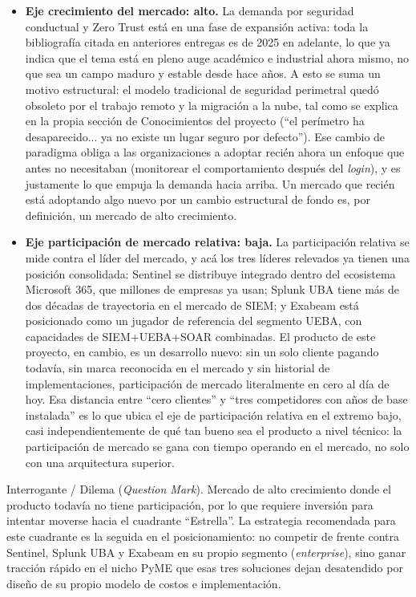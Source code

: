 \begin{itemize}
	\item \textbf{Eje crecimiento del mercado: alto.} La demanda por seguridad conductual y Zero Trust está en una fase de expansión activa: toda la bibliografía citada en anteriores entregas es de 2025 en adelante, lo que ya indica que el tema está en pleno auge académico e industrial ahora mismo, no que sea un campo maduro y estable desde hace años. A esto se suma un motivo estructural: el modelo tradicional de seguridad perimetral quedó obsoleto por el trabajo remoto y la migración a la nube, tal como se explica en la propia sección de Conocimientos del proyecto (``el perímetro ha desaparecido... ya no existe un lugar seguro por defecto''). Ese cambio de paradigma obliga a las organizaciones a adoptar recién ahora un enfoque que antes no necesitaban (monitorear el comportamiento después del \emph{login}), y es justamente lo que empuja la demanda hacia arriba. Un mercado que recién está adoptando algo nuevo por un cambio estructural de fondo es, por definición, un mercado de alto crecimiento.
	\item \textbf{Eje participación de mercado relativa: baja.} La participación relativa se mide contra el líder del mercado, y acá los tres líderes relevados ya tienen una posición consolidada: Sentinel se distribuye integrado dentro del ecosistema Microsoft 365, que millones de empresas ya usan; Splunk UBA tiene más de dos décadas de trayectoria en el mercado de SIEM; y Exabeam está posicionado como un jugador de referencia del segmento UEBA, con capacidades de SIEM+UEBA+SOAR combinadas. El producto de este proyecto, en cambio, es un desarrollo nuevo: sin un solo cliente pagando todavía, sin marca reconocida en el mercado y sin historial de implementaciones, participación de mercado literalmente en cero al día de hoy. Esa distancia entre ``cero clientes'' y ``tres competidores con años de base instalada'' es lo que ubica el eje de participación relativa en el extremo bajo, casi independientemente de qué tan bueno sea el producto a nivel técnico: la participación de mercado se gana con tiempo operando en el mercado, no solo con una arquitectura superior.
\end{itemize}

Interrogante / Dilema (\emph{Question Mark}). Mercado de alto crecimiento donde el producto todavía no tiene participación, por lo que requiere inversión para intentar moverse hacia el cuadrante ``Estrella''. La estrategia recomendada para este cuadrante es la seguida en el posicionamiento: no competir de frente contra Sentinel, Splunk UBA y Exabeam en su propio segmento (\emph{enterprise}), sino ganar tracción rápido en el nicho PyME que esas tres soluciones dejan desatendido por diseño de su propio modelo de costos e implementación.

